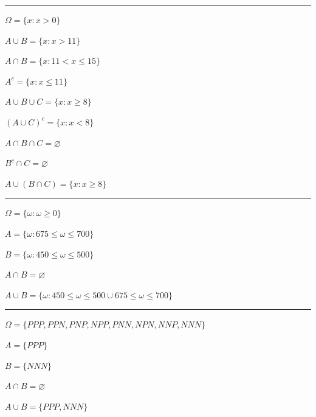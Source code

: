 \documentclass[a4paper,11pt,fleqn]{article}\usepackage[]{graphicx}\usepackage[]{color}
\theoremstyle{definition}
\begin{document}
\begin{compactenum}
\vspace{0.3cm}
\hrule
\vspace{0.3cm}

\item
  \begin{compactenum}
  \item $\Omega = \{x : x > 0\}$ \,
  \item $A \cup B = \{x : x > 11 \}$ \,
  \item $A \cap B = \{x : 11 < x \leq 15\}$ \,
  \item $A^{c} = \{x : x \leq 11 \}$ \,
  \item $A \cup B \cup C = \{x : x \geq 8\}$ \,
  \item $(A \cup C)^{c} = \{x : x < 8\}$ \,
  \item $A \cap B \cap C = \varnothing$ \,
  \item $B^{c} \cap C = \varnothing$ \,
  \item $A \cup (B \cap C) = \{x : x \geq 8\}$
  \end{compactenum}

\vspace{0.3cm}
\hrule
\vspace{0.3cm}

\item $\Omega = \{\omega : \omega \geq 0\}$
  \begin{compactenum}
  \item $A = \{\omega : 675 \leq \omega \leq 700 \}$
  \item $B = \{\omega : 450 \leq \omega \leq 500 \}$ \,
  \item $A \cap B = \varnothing$ \,
  \item $A \cup B = \{\omega : 450 \leq \omega \leq 500 \cup 675 \leq
    \omega \leq 700\}$
  \end{compactenum}

\vspace{0.3cm}
\hrule
\vspace{0.3cm}

\item $\Omega = \{PPP, PPN, PNP, NPP, PNN, NPN, NNP, NNN\}$
  \begin{compactenum}
  \item $A = \{PPP\}$
  \item $B = \{NNN\}$
  \item $A \cap B = \varnothing$ \,
  \item $A \cup B = \{PPP, NNN\}$
  \end{compactenum}


\end{compactenum}
\end{document}
